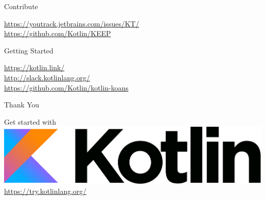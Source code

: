 {
	

\begin{frame}{Contribute}
	\begin{center}
		\LARGE \href{https://youtrack.jetbrains.com/issues/KT/}{https://youtrack.jetbrains.com/issues/KT/}\\
		\href{https://github.com/Kotlin/KEEP}{https://github.com/Kotlin/KEEP}
	\end{center}
\end{frame}

\begin{frame}{Getting Started}
	\begin{center}
		\LARGE \href{https://kotlin.link/}{https://kotlin.link/}\\
		\href{http://slack.kotlinlang.org/}{http://slack.kotlinlang.org/}\\
		\href{https://github.com/Kotlin/kotlin-koans}{https://github.com/Kotlin/kotlin-koans}
	\end{center}
\end{frame}

\begin{frame}{Thank You}
	\begin{center}
		\LARGE Get started with\\
		\vspace{.5cm}
		\includegraphics[width=.5\paperwidth]{figures/kotlinLogo2}\\
		\vspace{.5cm}
		\href{https://try.kotlinlang.org/}{https://try.kotlinlang.org/}
	\end{center}
\end{frame}

}